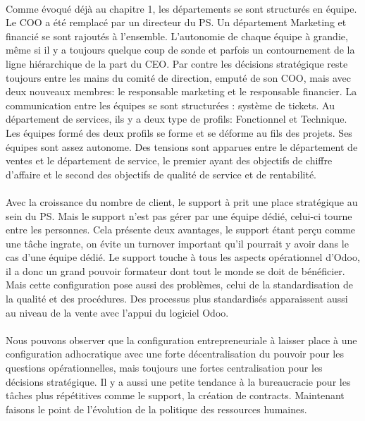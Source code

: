 \paragraph{} Comme évoqué déjà au chapitre 1, les départements se sont structurés en équipe. Le COO a été remplacé par un directeur du PS. Un département Marketing et financié se sont rajoutés à l'ensemble. L'autonomie de chaque équipe à grandie, même si il y a toujours quelque coup de sonde et parfois un contournement de la ligne hiérarchique de la part du CEO. Par contre les décisions stratégique reste toujours entre les mains du comité de direction, emputé de son COO, mais avec deux nouveaux membres: le responsable marketing et le responsable financier. La communication entre les équipes se sont structurées : système de tickets. Au département de services, ils y a deux type de profils: Fonctionnel et Technique. Les équipes formé des deux profils se forme et se déforme au fils des projets. Ses équipes sont assez autonome. Des tensions sont apparues entre le département de ventes et le département de service, le premier ayant des objectifs de chiffre d'affaire et le second des objectifs de qualité de service et de rentabilité.

\paragraph{} Avec la croissance du nombre de client, le support à prit une place stratégique au sein du PS. Mais le support n'est pas gérer par une équipe dédié, celui-ci tourne entre les personnes. Cela présente deux avantages, le support étant perçu comme une tâche ingrate, on évite un turnover important qu'il pourrait y avoir dans le cas d'une équipe dédié. Le support touche à tous les aspects opérationnel d'Odoo, il a donc un grand pouvoir formateur dont tout le monde se doit de bénéficier. Mais cette configuration pose aussi des problèmes, celui de la standardisation de la qualité et des procédures. Des processus plus standardisés apparaissent aussi au niveau de la vente avec l'appui du logiciel Odoo. 

\paragraph{} Nous pouvons observer que la configuration entrepreneuriale à laisser place à une configuration adhocratique\citep[pp. 53-54]{pichault} avec une forte décentralisation du pouvoir pour les questions opérationnelles, mais toujours une fortes centralisation pour les décisions stratégique. Il y a aussi une petite tendance à la bureaucracie pour les tâches plus répétitives comme le support, la création de contracts. Maintenant faisons le point de l'évolution de la politique des ressources humaines. 

